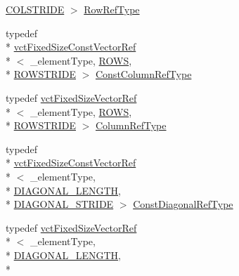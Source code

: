 \begin{DoxyCompactItemize}
\hyperlink{classvct_fixed_size_const_matrix_base_a0aa9b864b8810dd6a50640c965564bd0aee4513ad3dee685fdda1bc2c264be993}{C\-O\-L\-S\-T\-R\-I\-D\-E} $>$ \hyperlink{classvct_fixed_size_const_matrix_base_a2ce1bc7d955f66d28462cb34b62d69b7}{Row\-Ref\-Type}
\item 
typedef \\*
\hyperlink{classvct_fixed_size_const_vector_ref}{vct\-Fixed\-Size\-Const\-Vector\-Ref}\\*
$<$ \-\_\-element\-Type, \hyperlink{classvct_fixed_size_const_matrix_base_a05da4a844e1880e31d3052abb9a8063ba628eeb65016492a84b40dad539262735}{R\-O\-W\-S}, \\*
\hyperlink{classvct_fixed_size_const_matrix_base_a0aa9b864b8810dd6a50640c965564bd0a1249f054e777d0972eee94e9e33c3f4f}{R\-O\-W\-S\-T\-R\-I\-D\-E} $>$ \hyperlink{classvct_fixed_size_const_matrix_base_a68ed47f84a2855832fa0c18fafda6843}{Const\-Column\-Ref\-Type}
\item 
typedef \hyperlink{classvct_fixed_size_vector_ref}{vct\-Fixed\-Size\-Vector\-Ref}\\*
$<$ \-\_\-element\-Type, \hyperlink{classvct_fixed_size_const_matrix_base_a05da4a844e1880e31d3052abb9a8063ba628eeb65016492a84b40dad539262735}{R\-O\-W\-S}, \\*
\hyperlink{classvct_fixed_size_const_matrix_base_a0aa9b864b8810dd6a50640c965564bd0a1249f054e777d0972eee94e9e33c3f4f}{R\-O\-W\-S\-T\-R\-I\-D\-E} $>$ \hyperlink{classvct_fixed_size_const_matrix_base_a9cbbc3a040a90709bdeac3b94c766131}{Column\-Ref\-Type}
\item 
typedef \\*
\hyperlink{classvct_fixed_size_const_vector_ref}{vct\-Fixed\-Size\-Const\-Vector\-Ref}\\*
$<$ \-\_\-element\-Type, \\*
\hyperlink{classvct_fixed_size_const_matrix_base_ad4ad7a7ed23628b65949dbbf56d388f4ab8ef0428d870c5a6319df40288a7f43d}{D\-I\-A\-G\-O\-N\-A\-L\-\_\-\-L\-E\-N\-G\-T\-H}, \\*
\hyperlink{classvct_fixed_size_const_matrix_base_ad4ad7a7ed23628b65949dbbf56d388f4aa23755b132b8c416884bd2e751ea69ca}{D\-I\-A\-G\-O\-N\-A\-L\-\_\-\-S\-T\-R\-I\-D\-E} $>$ \hyperlink{classvct_fixed_size_const_matrix_base_a54699d7dbe28072365fab4aa99c68d66}{Const\-Diagonal\-Ref\-Type}
\item 
typedef \hyperlink{classvct_fixed_size_vector_ref}{vct\-Fixed\-Size\-Vector\-Ref}\\*
$<$ \-\_\-element\-Type, \\*
\hyperlink{classvct_fixed_size_const_matrix_base_ad4ad7a7ed23628b65949dbbf56d388f4ab8ef0428d870c5a6319df40288a7f43d}{D\-I\-A\-G\-O\-N\-A\-L\-\_\-\-L\-E\-N\-G\-T\-H}, \\*

\end{DoxyCompactItemize}
